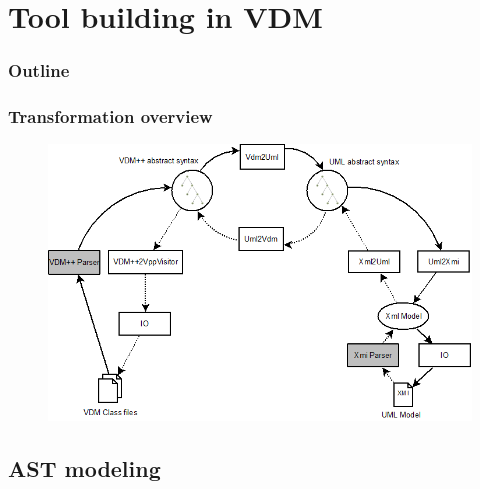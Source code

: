 %
%
\section{Tool building in VDM}
%
%
\begin{frame}
  \frametitle{Outline}
  \tableofcontents[current]
\end{frame}





%
%
\frame
{
  \frametitle{Transformation overview}

\begin{center}

\begin{figure}

\includegraphics[width=\textwidth]{images/OverviewOverMapping.png}

\end{figure}

\end{center}
}




\subsection{AST modeling}



